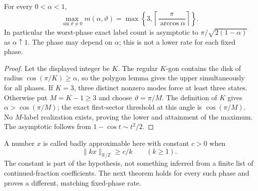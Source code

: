 \begin{theorem}\label{thm:r69-worst-phase}
For every $0<\alpha<1$,
\begin{equation}\label{eq:r69-worst-phase}
 \max_{\sin\vartheta\ne0}m(\alpha,\vartheta)
  =\max\left\{3,\left\lceil\frac\pi{\arccos\alpha}\right\rceil\right\}.
\end{equation}
In particular the worst-phase exact label count is asymptotic to
$\pi/\sqrt{2(1-\alpha)}$ as $\alpha\uparrow1$. The phase may depend on $\alpha$; this is not a lower rate for each fixed phase.
\end{theorem}
\begin{proof}
Let the displayed integer be $K$. The regular $K$-gon contains the disk of radius $\cos(\pi/K)\ge\alpha$, so the polygon lemma gives the upper simultaneously for all phases. If $K=3$, three distinct nonzero modes force at least three states. Otherwise put $M=K-1\ge3$ and choose $\vartheta=\pi/M$. The definition of $K$ gives $\alpha>\cos(\pi/M)$; the exact first-sector threshold at this angle is $\cos(\pi/M)$. No $M$-label realization exists, proving the lower and attainment of the maximum. The asymptotic follows from $1-\cos t\sim t^2/2$.
\end{proof}

A number $x$ is called badly approximable here with constant $c>0$ when
\begin{equation}\label{eq:r69-diophantine}
 \|kx\|_{\mathbb R/\mathbb Z}\ge c/k\qquad(k\ge1).
\end{equation}
The constant is part of the hypothesis, not something inferred from a finite list of continued-fraction coefficients. The next theorem holds for every such phase and proves a different, matching fixed-phase rate.

